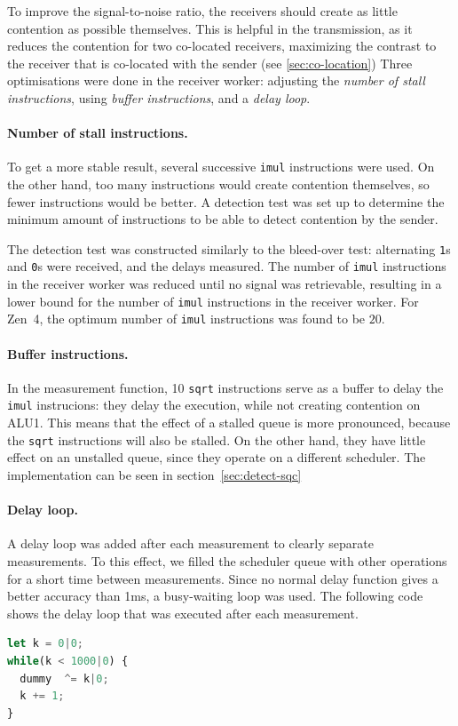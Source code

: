 \documentclass[11pt,
  titlepage=false,
]{scrreprt}
\begin{document}
To improve the signal-to-noise ratio, the receivers should create as little contention as possible themselves.
This is helpful in the transmission, as it reduces the contention for two co-located receivers,
maximizing the contrast to the receiver that is co-located with the sender (see \ref{sec:co-location})
Three optimisations were done in the receiver worker: adjusting the \textit{number of stall instructions},
using \textit{buffer instructions}, and a \textit{delay loop}.

\paragraph{Number of stall instructions.}
To get a more stable result, several successive \texttt{imul} instructions were used.
On the other hand, too many instructions would create contention themselves, so fewer instructions would be better.
A detection test was set up to determine the minimum amount of instructions to be able to detect contention by the sender.

The detection test was constructed similarly to the bleed-over test:
alternating \texttt{1}s and \texttt{0}s were received, and the delays measured.
The number of \texttt{imul} instructions in the receiver worker was reduced until no signal was retrievable,
resulting in a lower bound for the number of \texttt{imul} instructions in the receiver worker.
For Zen~4, the optimum number of \texttt{imul} instructions was found to be $20$.

\paragraph{Buffer instructions.}
In the measurement function, 10 \texttt{sqrt} instructions serve as a buffer to delay the \texttt{imul} instrucions:
they delay the execution, while not creating contention on ALU1.
This means that the effect of a stalled queue is more pronounced, because the \texttt{sqrt} instructions will also be stalled.
On the other hand, they have little effect on an unstalled queue, since they operate on a different scheduler.
The implementation can be seen in section~\ref{sec:detect-sqc}

\paragraph{Delay loop.}
A delay loop was added after each measurement to clearly separate measurements.
To this effect, we filled the scheduler queue with other operations for a short time between measurements.
Since no normal delay function gives a better accuracy than 1ms, a busy-waiting loop was used.
The following code shows the delay loop that was executed after each measurement.
\begin{lstlisting}[language=JavaScript]
let k = 0|0;
while(k < 1000|0) {
  dummy  ^= k|0;
  k += 1;
}
\end{lstlisting}
\end{document}
